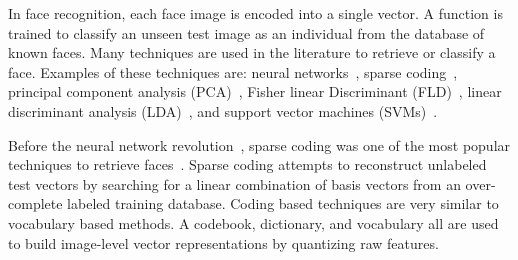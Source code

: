 
       

        In face recognition, each face image is encoded into a single vector. A function is trained to classify an
        unseen test image as an individual from the database of known faces. Many techniques are used in the literature
        to retrieve or classify a face. Examples of these techniques are: neural networks~\cite{turk_eigenfaces_1991,
        taigman_deepface_2014}, sparse coding~\cite{wright_robust_2009, jiang_label_2013}, principal component analysis
        (PCA)~\cite{craw_face_1992}, Fisher linear Discriminant (FLD)~\cite{liu_robust_2000}, linear discriminant
        analysis (LDA)~\cite{lu_face_2003}, and support vector machines (SVMs)~\cite{phillips_support_1998,
        levy_svmminus_2013}.

        Before the neural network revolution~\cite{krizhevsky_imagenet_2012}, sparse coding was one of the most popular
        techniques to retrieve faces~\cite{aharon_ksvd_2006, wright_robust_2009, zhang_sparse_2011, jiang_label_2013}.
        Sparse coding attempts to reconstruct unlabeled test vectors by searching for a linear combination of basis
        vectors from an over-complete labeled training database. Coding based techniques are very similar to vocabulary
        based methods. A codebook, dictionary, and vocabulary all are used to build image-level vector representations
        by quantizing raw features.


